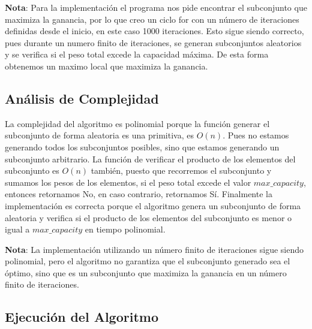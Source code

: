 \documentclass{article}
\begin{document}
\textbf{Nota}: Para la implementación el programa nos pide encontrar el subconjunto que maximiza la ganancia, por lo que creo un ciclo for con un número de iteraciones definidas desde el inicio, en este caso 1000 iteraciones.
Esto sigue siendo correcto, pues durante un numero finito de iteraciones, se generan subconjuntos aleatorios y se verifica si el peso total excede la capacidad máxima. De esta forma obtenemos un 
maximo local que maximiza la ganancia.
\subsection{Análisis de Complejidad}
La complejidad del algoritmo es polinomial porque la función generar el subconjunto 
de forma aleatoria es una primitiva, es $O(n)$. Pues no estamos generando
todos los subconjuntos posibles, sino que estamos generando un subconjunto arbitrario.
La función de verificar el producto de los elementos del subconjunto es $O(n)$ también, puesto que
recorremos el subconjunto y sumamos los pesos de los elementos, si el peso total excede el valor $max\_capacity$, 
entonces retornamos No, en caso contrario, retornamos Sí. 
Finalmente la implementación es correcta porque el algoritmo genera un subconjunto de forma aleatoria
y verifica si el producto de los elementos del subconjunto es menor o igual a $max\_capacity$ en tiempo polinomial.

\textbf{Nota}: La implementación utilizando un número finito de iteraciones sigue siendo polinomial, pero el algoritmo no garantiza que el subconjunto generado sea el óptimo, sino que es un subconjunto que maximiza la ganancia en un número finito de iteraciones.

\subsection{Ejecución del Algoritmo}
\end{document}
